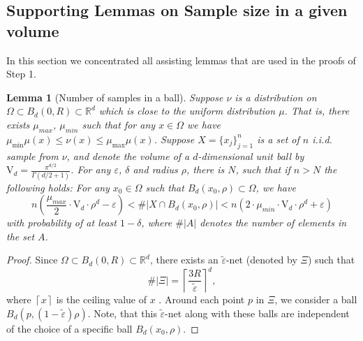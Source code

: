 \documentclass[12pt]{article}
\newtheorem{Lemma}[Theorem]{Lemma}
\theoremstyle{remark}
\newcommand{\RR}{\mathbb{R}}
\newcommand{\eps}{\varepsilon}
\newcommand{\ceil}[1]{\left\lceil #1 \right\rceil}
\newcommand{\abs}[1]{\left\vert #1 \right\vert}
\begin{document}
\begin{appendices}
\subsection{Supporting Lemmas on Sample size in a given volume}
In this section we concentrated all assisting lemmas that are used in the proofs of Step 1.

\begin{Lemma}[Number of samples in a ball]\label{lem:sampling_density_almost_uniform_clean}
Suppose $\nu$ is a distribution on $\Omega\subset B_d(0,R) \subset \RR^d$ which is close to the uniform distribution $\mu$. That is, there exists $\mu_{max}$, $\mu_{min}$  such that for any $x\in \Omega$ we have  $\mu_{\min}\mu(x) \leq \nu(x) \leq \mu_{\max}\mu(x)$. Suppose $X=\{x_j\}_{j=1}^n$ is a set of $n$ i.i.d. sample from $\nu$, and denote the volume of a $ d $-dimensional unit ball by  $ \mathrm{V}_d = \frac{\pi^{d/2}}{\Gamma(d/2+1)} $. For any $\eps$, $\delta$ and radius $\rho$, there is $N$, such that if $n>N$ the following holds: For any $x_0\in \Omega$ such that $B_d(x_0,\rho)\subset \Omega$, we have 
\[
n(\frac{\mu_{max}}{2}\cdot \mathrm{V}_d \cdot\rho^d-\eps) < \#|X \cap B_d(x_0, \rho)| < n(2\cdot \mu_{min}\cdot \mathrm{V}_d \cdot\rho^d+\eps)
\]
with probability of at least $1-\delta$, where $\#|A|$ denotes the number of elements in the set $A$.
\end{Lemma}
\begin{proof}
Since $\Omega \subset B_d(0,R)\subset\RR^d$, there exists an $\tilde\eps$-net (denoted by $\Xi$) such that 
\[
\#\abs{\Xi} = \ceil{ \frac{3R}{\tilde\eps}}^d
,\]
where $ \ceil{x} $ is the ceiling value of $ x $ \cite{vershynin2018high}.
Around each point $p$ in $\Xi$, we consider a ball $B_d(p, (1 - \tilde\eps)\rho)$. 
Note, that this $\tilde\eps$-net along with these balls are independent of the choice of a specific ball $B_d(x_0,\rho)$.


\end{proof}
\end{appendices}
\end{document}
